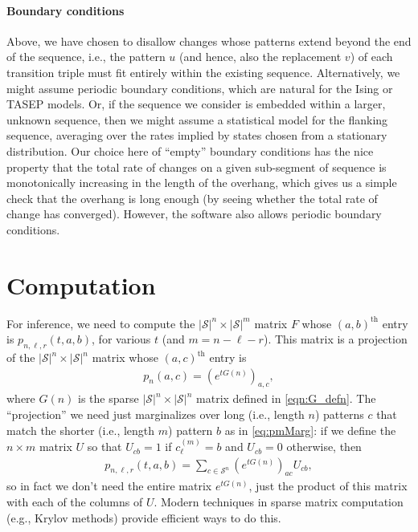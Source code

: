 \documentclass{article}
\newcommand{\calS}{\mathcal{S}}  %
\theoremstyle{plain}
\theoremstyle{definition}
\begin{document}
\paragraph{Boundary conditions} 
Above, we have chosen to disallow changes whose patterns extend beyond the end of the sequence,
i.e., the pattern $u$ (and hence, also the replacement $v$) of each transition triple
must fit entirely within the existing sequence.
Alternatively, we might assume periodic boundary conditions,
which are natural for the Ising or TASEP models.
Or, if the sequence we consider is embedded within a larger, unknown sequence,
then we might assume a statistical model for the flanking sequence,
averaging over the rates implied by states chosen from a stationary distribution.
Our choice here of ``empty'' boundary conditions
has the nice property that the total rate of changes on a given sub-segment of sequence
is monotonically increasing in the length of the overhang,
which gives us a simple check that the overhang is long enough
(by seeing whether the total rate of change has converged).
However, the software also allows periodic boundary conditions.


\section{Computation}

For inference, we need to compute the $|\calS|^{n} \times |\calS|^m$ matrix $F$ whose $(a,b)^\text{th}$ entry is $p_{n,\ell,r}(t,a,b)$,
for various $t$ (and $m = n - \ell - r$).
This matrix is a projection of the $|\calS|^{n} \times |\calS|^{n}$ matrix whose $(a,c)^\text{th}$ entry is
\begin{align}
    p_{n}(a,c) = \left( e^{t G(n)} \right)_{a,c} ,
\end{align}
where $G(n)$ is the sparse $|\calS|^{n} \times |\calS|^{n}$ matrix defined in \eqref{eqn:G_defn}.
The ``projection'' we need just marginalizes over long (i.e., length $n$) patterns $c$ that match the shorter (i.e., length $m$) pattern $b$
as in \eqref{eq:pmMarg}:
if we define the $n \times m$ matrix $U$ so that $U_{cb}=1$ if $c_\ell^{(m)}=b$ and $U_{cb}=0$ otherwise,
then
\begin{align} \label{eqn:Tmer_trans}
    p_{n,\ell,r}(t,a,b) = \sum_{c \in \calS^{n}} \left( e^{t G(n)} \right)_{ac} U_{cb} ,
\end{align}
so in fact we don't need the entire matrix $e^{t G(n)}$,
just the product of this matrix with each of the columns of $U$.
Modern techniques in sparse matrix computation (e.g., Krylov methods) provide efficient ways to do this.
\end{document}
